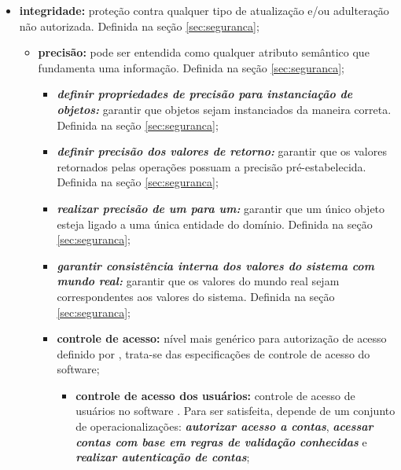 \begin{itemize}
	
	\item \textbf{integridade:} proteção contra qualquer tipo de atualização e/ou adulteração não autorizada. Definida na seção \ref{sec:seguranca};
	
	\begin{itemize}
		
		\item \textbf{precisão:} pode ser entendida como qualquer atributo semântico que fundamenta uma informação. Definida na seção \ref{sec:seguranca};
		
		\begin{itemize}
			
			\item \textbf{\textit{definir propriedades de precisão para instanciação de objetos:}} garantir que objetos sejam instanciados da maneira correta. Definida na seção \ref{sec:seguranca};
			
			\item \textbf{\textit{definir precisão dos valores de retorno:}} garantir que os valores retornados pelas operações possuam a precisão pré-estabelecida. Definida na seção \ref{sec:seguranca};
			
			\item \textbf{\textit{realizar precisão de um para um:}} garantir que um único objeto esteja ligado a uma única entidade do domínio. Definida na seção \ref{sec:seguranca};
			
			\item \textbf{\textit{garantir consistência interna dos valores do sistema com mundo real:}} garantir que os valores do mundo real sejam correspondentes aos valores do sistema. Definida na seção \ref{sec:seguranca};
			
			\item \textbf{controle de acesso:} nível mais genérico para autorização de acesso definido por \cite{chung2012non}, trata-se das especificações de controle de acesso do software; 
			
			\begin{itemize}
				
				\item \textbf{controle de acesso dos usuários:} controle de acesso de usuários no software \cite{chung2012non}. Para ser satisfeita, depende de um conjunto de operacionalizações: \textbf{\textit{autorizar acesso a contas}}, \textbf{\textit{acessar contas com base em regras de validação conhecidas}} e \textbf{\textit{realizar autenticação de contas}};
				

\end{itemize}
\end{itemize}
\end{itemize}
\end{itemize}
